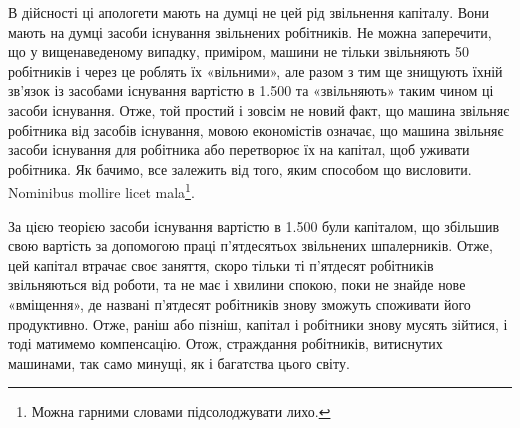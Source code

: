 В дійсності ці апологети мають на думці не цей рід звільнення
капіталу. Вони мають на думці засоби існування звільнених робітників.
Не можна заперечити, що у вищенаведеному випадку,
приміром, машини не тільки звільняють 50 робітників і через це
роблять їх «вільними», але разом з тим ще знищують їхній зв’язок
із засобами існування вартістю в \num{1.500} та
«звільняють» таким чином ці засоби існування. Отже, той простий
і зовсім не новий факт, що машина звільняє робітника від
засобів існування, мовою економістів означає, що машина звільняє
засоби існування для робітника або перетворює їх на капітал,
щоб уживати робітника. Як бачимо, все залежить від того, яким
способом що висловити. Nominibus mollire licet mala\footnote*{
Можна гарними словами підсолоджувати лихо. 
}.

За цією теорією засоби існування вартістю в \num{1.500} були капіталом, що збільшив свою вартість за допомогою
праці п’ятдесятьох звільнених шпалерників. Отже, цей
капітал втрачає своє заняття, скоро тільки ті п’ятдесят робітників
звільняються від роботи, та не має і хвилини спокою, поки
не знайде нове «вміщення», де названі п’ятдесят робітників
знову зможуть споживати його продуктивно. Отже, раніш або
пізніш, капітал і робітники знову мусять зійтися, і тоді матимемо
компенсацію. Отож, страждання робітників, витиснутих машинами,
так само минущі, як і багатства цього світу.


